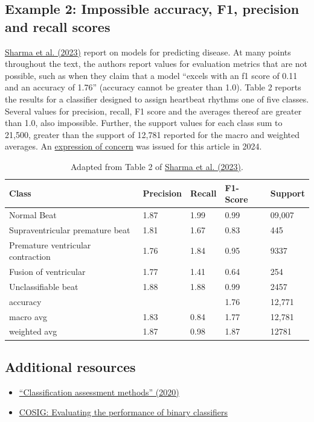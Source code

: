 \documentclass[letterpaper, 12pt]{article}
\begin{document}
\pagebreak

\subsection*{Example 2: Impossible accuracy, F1, precision and recall scores}

\href{https://doi.org/10.1109/IC3I59117.2023.10397896}{Sharma et al. (2023)} report on models for predicting disease. At many points throughout the text, the authors report values for evaluation metrics that are not possible, such as when they claim that a model ``excels with an f1
score of 0.11 and an accuracy of 1.76'' (accuracy cannot be greater than 1.0). Table 2 reports the results for a classifier designed to assign heartbeat rhythms one of five classes. Several values for precision, recall, F1 score and the averages thereof are greater than 1.0, also impossible. Further, the support values for each class sum to 21,500, greater than the support of 12,781 reported for the macro and weighted averages. An \href{https://doi.org/10.1109/IC3I59117.2023.10703725}{expression of concern} was issued for this article in 2024.

\bgroup
\def\arraystretch{1.3}
\begin{table}[h!tbp]
\centering
\small
\begin{tabular}{|l|l|l|l|l|}
\hline
\textbf{Class} & \textbf{Precision} & \textbf{Recall} & \textbf{F1-Score} & \textbf{Support} \\ \hline
Normal Beat                       & 1.87 & 1.99 & 0.99 & 09,007 \\ \hline
Supraventricular premature beat   & 1.81 & 1.67 & 0.83 & 445    \\ \hline
Premature ventricular contraction & 1.76 & 1.84 & 0.95 & 9337   \\ \hline
Fusion of ventricular             & 1.77 & 1.41 & 0.64 & 254    \\ \hline
Unclassifiable beat               & 1.88 & 1.88 & 0.99 & 2457   \\ \hline
accuracy                          &      &      & 1.76 & 12,771 \\ \hline
macro avg                         & 1.83 & 0.84 & 1.77 & 12,781 \\ \hline
weighted avg                      & 1.87 & 0.98 & 1.87 & 12781  \\ \hline
\end{tabular}
\caption*{Adapted from Table 2 of \href{https://doi.org/10.1109/IC3I59117.2023.10397896}{Sharma et al. (2023)}.}
\end{table}
\egroup

\subsection*{Additional resources}

\begin{itemize}
    \setlength\itemsep{-0.5em}
    \item \href{https://doi.org/10.1016/j.aci.2018.08.003}{``Classification assessment methods'' (2020)}
    \item  \href{https://osf.io/pvr4a}{COSIG: Evaluating the performance of binary classifiers}
\end{itemize}
\end{document}
